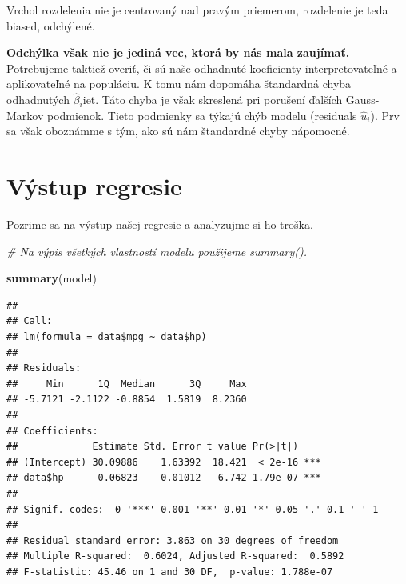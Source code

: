 \documentclass[]{article}
\newenvironment{Shaded}{\begin{snugshade}}{\end{snugshade}}
\newcommand{\CommentTok}[1]{\textcolor[rgb]{0.56,0.35,0.01}{\textit{#1}}}
\newcommand{\KeywordTok}[1]{\textcolor[rgb]{0.13,0.29,0.53}{\textbf{#1}}}
\newcommand{\NormalTok}[1]{#1}
\newcommand{\OperatorTok}[1]{\textcolor[rgb]{0.81,0.36,0.00}{\textbf{#1}}}
\begin{document}
Vrchol rozdelenia nie je centrovaný nad pravým priemerom, rozdelenie je
teda biased, odchýlené.

\textbf{Odchýlka však nie je jediná vec, ktorá by nás mala zaujímať.}
Potrebujeme taktiež overiť, či sú naše odhadnuté koeficienty
interpretovateľné a aplikovateľné na populáciu. K tomu nám dopomáha
štandardná chyba odhadnutých \(\hat\beta{}_i\)iet. Táto chyba je však
skreslená pri porušení ďalších Gauss-Markov podmienok. Tieto podmienky
sa týkajú chýb modelu (residuals \(\hat u_i\)). Prv sa však oboznámme s
tým, ako sú nám štandardné chyby nápomocné.

\hypertarget{vuxfdstup-regresie}{%
\section{Výstup regresie}\label{vuxfdstup-regresie}}

Pozrime sa na výstup našej regresie a analyzujme si ho troška.

\begin{Shaded}
\begin{Highlighting}[]
\CommentTok{# Na výpis všetkých vlastností modelu použijeme summary().}

\KeywordTok{summary}\NormalTok{(model)}
\end{Highlighting}
\end{Shaded}

\begin{verbatim}
## 
## Call:
## lm(formula = data$mpg ~ data$hp)
## 
## Residuals:
##     Min      1Q  Median      3Q     Max 
## -5.7121 -2.1122 -0.8854  1.5819  8.2360 
## 
## Coefficients:
##             Estimate Std. Error t value Pr(>|t|)    
## (Intercept) 30.09886    1.63392  18.421  < 2e-16 ***
## data$hp     -0.06823    0.01012  -6.742 1.79e-07 ***
## ---
## Signif. codes:  0 '***' 0.001 '**' 0.01 '*' 0.05 '.' 0.1 ' ' 1
## 
## Residual standard error: 3.863 on 30 degrees of freedom
## Multiple R-squared:  0.6024, Adjusted R-squared:  0.5892 
## F-statistic: 45.46 on 1 and 30 DF,  p-value: 1.788e-07
\end{verbatim}

\begin{Shaded}
\end{Shaded}
\end{document}
